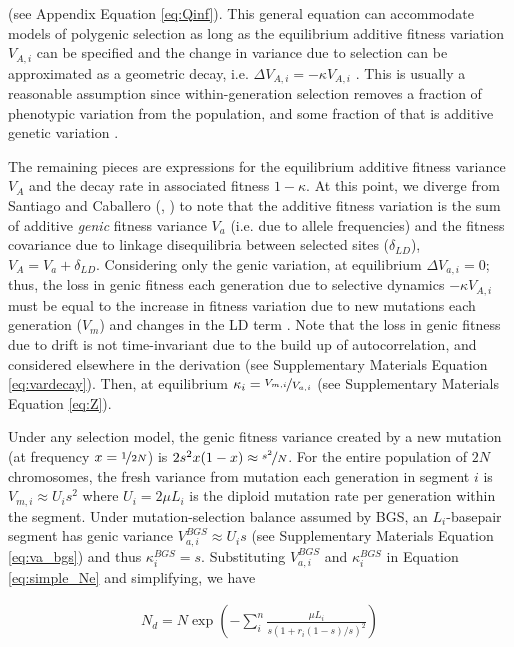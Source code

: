 \documentclass[11pt]{article}
\begin{document}
(see Appendix Equation \ref{eq:Qinf}). This general equation can accommodate
models of polygenic selection as long as the equilibrium additive fitness
variation $V_{A,i}$ can be specified and the change in variance due to
selection can be approximated as a geometric decay, i.e. $\Delta V_{A,i} =
-\kappa V_{A,i}$ \parencite{Bulmer1971-ae,Keightley1988-eq,Walsh2018-bt}. This
is usually a reasonable assumption since within-generation selection removes a
fraction of phenotypic variation from the population, and some fraction of that
is additive genetic variation \parencite{Bulmer1971-ae,Keightley1988-eq}.

The remaining pieces are expressions for the equilibrium additive fitness
variance $V_A$ and the decay rate in associated fitness $1-\kappa$. At this
point, we diverge from Santiago and Caballero (\citeyear{Santiago1998-bs},
\citeyear{Santiago2016-mu}) to note that the additive fitness variation is the
sum of additive \emph{genic} fitness variance $V_a$ (i.e. due to allele
frequencies) and the fitness covariance due to linkage disequilibria between
selected sites ($\delta_{LD}$), $V_A = V_a + \delta_{LD}$. Considering only the
genic variation, at equilibrium $\Delta V_{a,i} = 0$; thus, the loss in genic
fitness each generation due to selective dynamics $-\kappa V_{A,i}$ must be
equal to the increase in fitness variation due to new mutations each generation
($V_m$) and changes in the LD term \parencite{Bulmer1971-ae}. Note that the
loss in genic fitness due to drift is not time-invariant due to the build up of
autocorrelation, and considered elsewhere in the derivation (see Supplementary
Materials Equation \ref{eq:vardecay}). Then, at equilibrium $\kappa_i =
\nicefrac{V_{m,i}}{V_{a,i}}$ (see Supplementary Materials Equation \ref{eq:Z}). 

Under any selection model, the genic fitness variance created by a new mutation
(at frequency $x=\nicefrac{1}{2N}$) is $2s^2 x(1-x) \approx \nicefrac{s^2}{N}$.
For the entire population of $2N$ chromosomes, the fresh variance from mutation
each generation in segment $i$ is $V_{m,i} \approx U_is^2$ where $U_i = 2\mu
L_i$ is the diploid mutation rate per generation within the segment. Under
mutation-selection balance assumed by BGS, an $L_i$-basepair segment has genic
variance $V_{a,i}^{BGS} \approx U_i s$ (see Supplementary Materials Equation
\ref{eq:va_bgs}) and thus $\kappa_i^{BGS} = s$. Substituting $V_{a,i}^{BGS}$
and $\kappa_i^{BGS}$ in Equation \eqref{eq:simple_Ne} and simplifying, we have

\begin{align}
    N_d = N \exp \left( - \sum_i^n \frac{\mu L_i}{s(1 + r_i(1-s)/s)^2} \right) 
\end{align}
\end{document}
